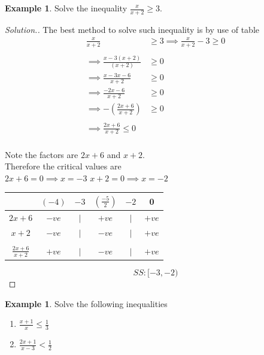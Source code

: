 \documentclass[11pt,a4paper]{article}
\theoremstyle{definition}
\newtheorem{example}[thm]{Example}
\newenvironment{solution}
  {\renewcommand{\qedsymbol}{}\begin{proof}[\textit{Solution}.]}
  {\end{proof}}
\begin{document}
\begin{example}

Solve the inequality $\frac{x}{x+2}\geq 3$.
\end{example}
\begin{solution}

The best method to solve such inequality is by use of table 
\begin{align*}
\frac{x}{x+2} &\geq 3\implies \frac{x}{x+2}-3\geq 0\\\\
\implies \frac{x-3(x+2)}{(x+2)} & \geq 0\\
\implies \frac{x-3x-6}{x+2} &\geq 0\\
\implies \frac{-2x-6}{x+2} &\geq 0\\
\implies -\left(\frac{2x+6}{x+2}\right) & \geq 0\\\\
\implies \frac{2x+6}{x+2}\leq 0\\
\end{align*}

Note the factors are $2x+6$ and $x+2$.\\
Therefore the critical values are\\
$2x+6=0\implies x=-3$
$x+2=0\implies x=-2$



\begin{table}[H]
\centering
\begin{tabular}{cccccc}
& $(-4)$ & $-3$ & $(\frac{-5}{2})$ & $-2$ & 0\\
\hline
\multicolumn{1}{c|}{$2x+6$}  & $-ve$ & $|$ & $+ve$ & $|$ & $+ve$\\
\multicolumn{1}{c|}{$x+2$} & $-ve$ & $|$ & $-ve$ & $|$ & $+ve$\\
\multicolumn{1}{c|}{}&&&&&\\
\multicolumn{1}{c|}{$\frac{2x+6}{x+2}$}  & $+ve$ & $|$ & $-ve$ & $|$ & $+ve$\\
\end{tabular}
\end{table}
$$SS:[-3,-2)$$
\end{solution}
\begin{example}

Solve the following inequalities
\begin{enumerate}
\item[(a).] $\frac{x+1}{x}\leq \frac{1}{3}$
\item[(b).] $\frac{2x+1}{x-3}<\frac{1}{2}$\\
\end{enumerate}
\end{example}
\end{document}
